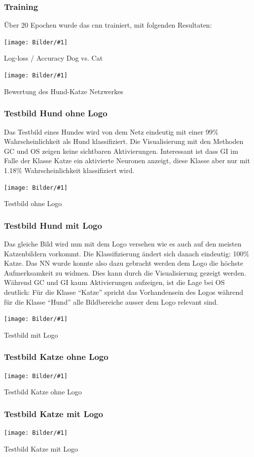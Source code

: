 \documentclass[
  12pt, %
  a4paper, %
  oneside, %
  openany, 
  numbers=noenddot, %
  BCOR=5mm, %
  parskip=half*, %
  thesis, %
]{bfhbook}
\newcommand{\imgText}[3]{
\begin{center}
    \begin{minipage}[t]{0.6\textwidth}
    		\vspace{0pt}
		\texttt{[image: Bilder/\#1]}
		\caption{#2}
	\end{minipage}\hfill
    \begin{minipage}[t]{0.4\textwidth}
    		\vspace{0pt}
  		#3
    \end{minipage}
\end{center}
}
\newcommand{\fullImg}[2]{
\begin{center}
\begin{minipage}[t]{\linewidth}
\texttt{[image: Bilder/\#1]}
\caption{#2}
\end{minipage}
\end{center}
}
\begin{document}
\subsubsection*{Training}
Über 20 Epochen wurde das \acrshort{cnn} trainiert, mit folgenden Resultaten:
\imgText{Training-Manipulated-LogLoss.png}{Log-loss / Accuracy Dog vs. Cat}{}

\imgText{Training-Manipulated-StatisticsTable.png}{Bewertung des Hund-Katze Netzwerkes}{

}

\subsubsection*{Testbild Hund ohne Logo}
Das Testbild eines Hundes wird von dem Netz eindeutig mit einer 99\% Wahrscheinlichkeit als Hund klassifiziert. Die Visualisierung mit den Methoden \acrshort{GC} und \Gls{OS} zeigen keine sichtbaren Aktivierungen. Interessant ist dass \Gls{GI} im Falle der Klasse Katze ein aktivierte Neuronen anzeigt, diese Klasse aber nur mit 1.18\% Wahrscheinlichkeit klassifiziert wird.
\fullImg{Manipulated_case_img7.png}{Testbild ohne Logo}

\subsubsection*{Testbild Hund mit Logo}
Das gleiche Bild wird nun mit dem Logo versehen wie es auch auf den meisten Katzenbildern vorkommt. Die Klassifizierung ändert sich danach eindeutig: 100\% Katze. Das \Gls{NN} wurde konnte also dazu gebracht werden dem Logo die höchste Aufmerksamkeit zu widmen. Dies kann durch die Visualisierung gezeigt werden. Während \Gls{GC} und \Gls{GI} kaum Aktivierungen aufzeigen, ist die Lage bei \Gls{OS} deutlich: Für die Klasse ``Katze'' spricht das Vorhandensein des Logos während für die Klasse ``Hund'' alle Bildbereiche ausser dem Logo relevant sind.
\fullImg{Manipulated_case_img8.png}{Testbild mit Logo}

\subsubsection*{Testbild Katze ohne Logo}
\fullImg{Manipulated_case_img4.png}{Testbild Katze ohne Logo}

\subsubsection*{Testbild Katze mit Logo}
\fullImg{Manipulated_case_img5.png}{Testbild Katze mit Logo}
\end{document}

